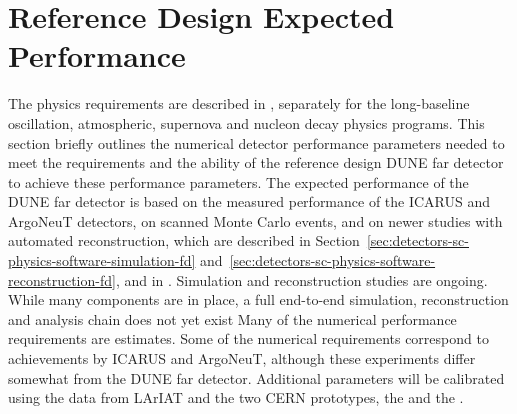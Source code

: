 
\section{Reference Design Expected Performance}
\label{sec:detectors-fd-ref-perf}

The physics requirements are described in \volphys,
separately for the long-baseline oscillation, atmospheric, supernova
and nucleon decay physics programs.  This section briefly outlines the
numerical detector performance parameters needed to meet the
requirements and the ability of the reference
design DUNE far detector to achieve these performance parameters.  The
expected performance of the DUNE far detector is based on the measured
performance of the ICARUS\cite{Amerio:2004ze} and
ArgoNeuT\cite{Anderson:2012vc} detectors, on scanned Monte Carlo
events\cite{docdb-6954}, and on newer studies with automated
reconstruction, which are described in
Section~\ref{sec:detectors-sc-physics-software-simulation-fd}
and~\ref{sec:detectors-sc-physics-software-reconstruction-fd}, and in
\anxreco.  Simulation and reconstruction studies are ongoing.  While
many components are in place, a full end-to-end simulation,
reconstruction and analysis chain does not yet exist Many
of the numerical performance requirements are estimates.  Some of the
numerical requirements correspond to achievements by ICARUS and
ArgoNeuT, although these experiments differ somewhat from the DUNE far
detector.  Additional parameters will be calibrated using the data
from LArIAT and the two CERN prototypes, the \cernsingleproto{} and
the \cerndualproto.

